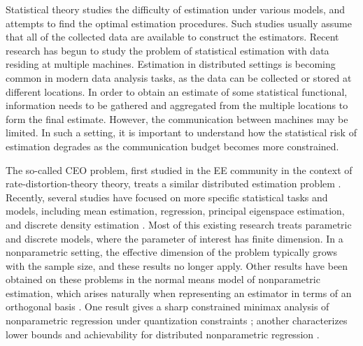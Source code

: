 \statbackground{}
Statistical theory studies the difficulty of estimation under
various models, and attempts to find the optimal estimation
procedures.  Such studies usually assume that all of the collected
data are available to construct the estimators.  Recent research
has begun to study the problem of statistical estimation with data
residing at
multiple machines.  Estimation in distributed settings is becoming
common in modern data analysis tasks, as the data can be collected or
stored at different locations.  In order to obtain an estimate of some
statistical functional, information needs to be gathered and
aggregated from the multiple locations to form the final
estimate. However, the communication between machines may be
limited. In such a setting, it is important to understand how the
statistical risk of estimation degrades as the communication budget
becomes more constrained.

The so-called CEO problem, first studied in the EE 
community in the context of rate-distortion-theory theory, treats a
similar distributed estimation problem \citep{berger1996ceo,
  viswanathan1997quadratic}.  Recently, several studies have
focused on more specific statistical tasks and models, including mean
estimation, regression, principal eigenspace estimation, and discrete
density estimation \citep{zhang2013information, shamir2014fundamental,
  battey2015distributed, braverman2016communication,
  diakonikolas2017communication, fan2017distributed,
  lee2017communication, shang2017computational}. Most of this existing
research treats parametric and discrete models, where the
parameter of interest has finite dimension.  In a nonparametric
setting, the effective dimension of the problem typically grows with
the sample size, and these results no longer apply.
Other results have been obtained on these problems in the normal means
model of nonparametric estimation, which arises naturally when representing an estimator in terms of an
orthogonal
basis \citep{johnstone2002function,tsybakov:2008}.  One
result gives a sharp constrained minimax analysis of nonparametric
regression under quantization constraints \citep{Zhu:18}; another
characterizes lower bounds and achievability for distributed
nonparametric regression \citep{Zhu:18b}.


